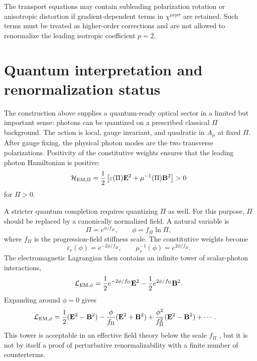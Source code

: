 \documentclass[12pt]{article}
\begin{document}
\begin{remark}
The transport equations may contain subleading polarization rotation or anisotropic distortion if gradient-dependent terms in $\chi^{\mu\nu\rho\sigma}$ are retained.  Such terms must be treated as higher-order corrections and are not allowed to renormalize the leading isotropic coefficient $p=2$.
\end{remark}

\section{Quantum interpretation and renormalization status}
\label{sec:quantum}

The construction above supplies a quantum-ready optical sector in a limited but important sense: photons can be quantized on a prescribed classical $\Pi$ background.  The action is local, gauge invariant, and quadratic in $A_\mu$ at fixed $\Pi$.  After gauge fixing, the physical photon modes are the two transverse polarizations.  Positivity of the constitutive weights ensures that the leading photon Hamiltonian is positive:
\begin{equation}
 \mathcal H_{\rm EM,\Pi}
 =\frac12\left[
   \varepsilon(\Pi)\mathbf E^2
  +\mu^{-1}(\Pi)\mathbf B^2
 \right]>0
\label{eq:H_positive}
\end{equation}
for $\Pi>0$.

A stricter quantum completion requires quantizing $\Pi$ as well.  For this purpose, $\Pi$ should be replaced by a canonically normalized field.  A natural variable is
\begin{equation}
 \Pi=e^{\phi/f_\Pi},
 \qquad
 \phi=f_\Pi\ln\Pi,
\label{eq:canonical_phi}
\end{equation}
where $f_\Pi$ is the progression-field stiffness scale.  The constitutive weights become
\begin{equation}
 \varepsilon_r(\phi)=e^{-2\phi/f_\Pi},
 \qquad
 \mu_r^{-1}(\phi)=e^{2\phi/f_\Pi}.
\label{eq:exp_weights}
\end{equation}
The electromagnetic Lagrangian then contains an infinite tower of scalar-photon interactions,
\begin{equation}
 \mathcal L_{\rm EM,\phi}
 =\frac12 e^{-2\phi/f_\Pi}\mathbf E^2
 -\frac12 e^{2\phi/f_\Pi}\mathbf B^2.
\label{eq:phi_photon_lagrangian}
\end{equation}
Expanding around $\phi=0$ gives
\begin{align}
 \mathcal L_{\rm EM,\phi}
 & =\frac12(\mathbf E^2-\mathbf B^2)
 -\frac{\phi}{f_\Pi}(\mathbf E^2+\mathbf B^2)
 +\frac{\phi^2}{f_\Pi^2}(\mathbf E^2-\mathbf B^2)+\cdots .
\label{eq:tower}
\end{align}
This tower is acceptable in an effective field theory below the scale $f_\Pi$ \cite{BirrellDavies1982,Weinberg1995,Burgess2004}, but it is not by itself a proof of perturbative renormalizability with a finite number of counterterms.
\end{document}
